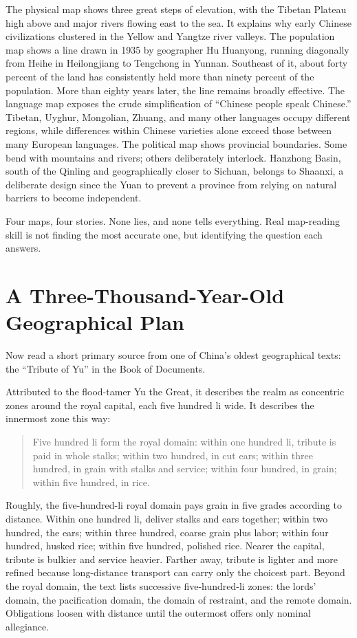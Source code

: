 The physical map shows three great steps of elevation, with the Tibetan Plateau high above and major rivers flowing east to the sea. It explains why early Chinese civilizations clustered in the Yellow and Yangtze river valleys. The population map shows a line drawn in 1935 by geographer Hu Huanyong, running diagonally from Heihe in Heilongjiang to Tengchong in Yunnan. Southeast of it, about forty percent of the land has consistently held more than ninety percent of the population. More than eighty years later, the line remains broadly effective. The language map exposes the crude simplification of ``Chinese people speak Chinese.'' Tibetan, Uyghur, Mongolian, Zhuang, and many other languages occupy different regions, while differences within Chinese varieties alone exceed those between many European languages. The political map shows provincial boundaries. Some bend with mountains and rivers; others deliberately interlock. Hanzhong Basin, south of the Qinling and geographically closer to Sichuan, belongs to Shaanxi, a deliberate design since the Yuan to prevent a province from relying on natural barriers to become independent.

Four maps, four stories. None lies, and none tells everything. Real map-reading skill is not finding the most accurate one, but identifying the question each answers.

\section{A Three-Thousand-Year-Old Geographical Plan}
Now read a short primary source from one of China's oldest geographical texts: the ``Tribute of Yu'' in the Book of Documents.

Attributed to the flood-tamer Yu the Great, it describes the realm as concentric zones around the royal capital, each five hundred li wide. It describes the innermost zone this way:

\begin{quote}
Five hundred li form the royal domain: within one hundred li, tribute is paid in whole stalks; within two hundred, in cut ears; within three hundred, in grain with stalks and service; within four hundred, in grain; within five hundred, in rice.
\end{quote}
Roughly, the five-hundred-li royal domain pays grain in five grades according to distance. Within one hundred li, deliver stalks and ears together; within two hundred, the ears; within three hundred, coarse grain plus labor; within four hundred, husked rice; within five hundred, polished rice. Nearer the capital, tribute is bulkier and service heavier. Farther away, tribute is lighter and more refined because long-distance transport can carry only the choicest part. Beyond the royal domain, the text lists successive five-hundred-li zones: the lords' domain, the pacification domain, the domain of restraint, and the remote domain. Obligations loosen with distance until the outermost offers only nominal allegiance.

